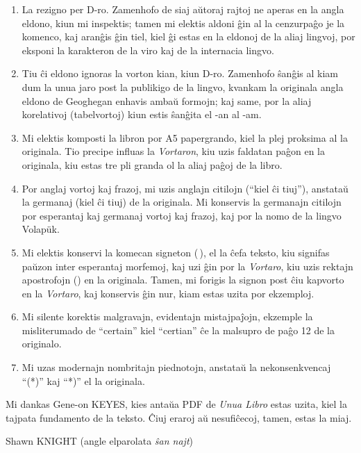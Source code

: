 \documentclass[12pt,twoside]{book}
\begin{document}
\begin{enumerate}

\item La rezigno per D-ro. Zamenhofo de siaj aŭtoraj rajtoj ne aperas en la angla eldono, kiun mi inspektis; tamen mi elektis aldoni ĝin al la cenzurpaĝo je la komenco, kaj aranĝis ĝin tiel, kiel ĝi estas en la eldonoj de la aliaj lingvoj, por eksponi la karakteron de la viro kaj de la internacia lingvo.

\item Tiu ĉi eldono ignoras la vorton \glqq{}kian\grqq{}, kiun D-ro. Zamenhofo ŝanĝis al \glqq{}kiam\grqq{} dum la unua jaro post la publikigo de la lingvo, kvankam la originala angla eldono de Geoghegan enhavis ambaŭ formojn; kaj same, por la aliaj korelativoj (tabelvortoj) kiun estis ŝanĝita el \glqq{}-an\grqq{} al \glqq{}-am\grqq{}.

\item Mi elektis komposti la libron por A5 papergrando, kiel la plej proksima al la originala.  Tio precipe influas la \emph{Vortaron}, kiu uzis faldatan paĝon en la originala, kiu estas tre pli granda ol la aliaj paĝoj de la libro.

\item Por anglaj vortoj kaj frazoj, mi uzis anglajn citilojn (``kiel ĉi tiuj''), anstataŭ la germanaj (\glqq{}kiel ĉi tiuj\grqq{}) de la originala.  Mi konservis la germanajn citilojn por esperantaj kaj germanaj vortoj kaj frazoj, kaj por la nomo de la lingvo Volap\"{u}k.

\item Mi elektis konservi la komecan signeton (\,), el la ĉefa teksto, kiu signifas paŭzon inter esperantaj morfemoj, kaj uzi ĝin por la \emph{Vortaro}, kiu uzis rektajn apostrofojn ({}) en la originala. Tamen, mi forigis la signon post ĉiu kapvorto en la \emph{Vortaro}, kaj konservis ĝin nur, kiam estas uzita por ekzemploj.

\item Mi silente korektis malgravajn, evidentajn mistajpaĵojn, ekzemple la misliterumado de ``certain'' kiel ``certian'' ĉe la malsupro de paĝo 12 de la originalo.

\item Mi uzas modernajn nombritajn piednotojn, anstataŭ la nekonsenkvencaj ``(*)'' kaj ``*)'' el la originala.

\end{enumerate}

Mi dankas Gene-on KEYES, kies antaŭa PDF de \emph{Unua Libro} estas uzita, kiel la tajpata fundamento de la teksto.  Ĉiuj eraroj aŭ nesufiĉecoj, tamen, estas la miaj.

\vspace{1ex}

{\setlength{\parindent}{0em}
Shawn KNIGHT (angle elparolata \emph{ŝan najt})\\
\hodiau}


\end{document}

